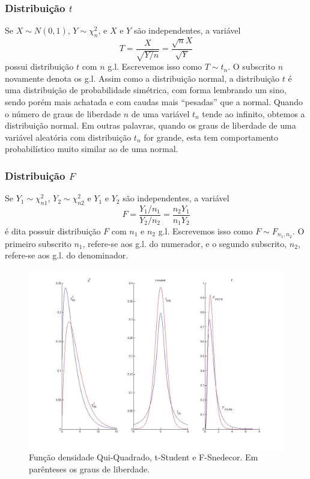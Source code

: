 \documentclass[
]{book}
\theoremstyle{definition}
\theoremstyle{definition}
\theoremstyle{definition}
\theoremstyle{remark}
\begin{document}
\hypertarget{distribuiuxe7uxe3o-t}{%
\subsubsection{\texorpdfstring{Distribuição \(t\)}{Distribuição t}}\label{distribuiuxe7uxe3o-t}}

Se \(X \sim N(0,1)\), \(Y \sim \chi^2_n\), e \(X\) e \(Y\) são independentes, a variável
\[T=\frac{X}{\sqrt{Y/n}}=\frac{\sqrt{n}X}{\sqrt{Y}}\]
possui distribuição \(t\) com \(n\) g.l. Escrevemos isso como \(T \sim t_n\). O subscrito \(n\) novamente
denota os g.l. Assim como a distribuição normal, a distribuição \(t\) é uma distribuição de probabilidade simétrica, com forma lembrando um sino, sendo porém mais achatada e com caudas mais ``pesadas'' que a normal. Quando o número de graus de liberdade \(n\) de uma variável \(t_n\) tende ao infinito, obtemos a distribuição normal. Em outras palavras, quando os graus de liberdade de uma variável aleatória com distribuição \(t_n\) for grande, esta tem comportamento probabilístico muito similar ao de uma normal.

\hypertarget{distribuiuxe7uxe3o-f}{%
\subsubsection{\texorpdfstring{Distribuição \(F\)}{Distribuição F}}\label{distribuiuxe7uxe3o-f}}

Se \(Y_1 \sim \chi^2_{n1}\), \(Y_2 \sim \chi^2_{n2}\) e \(Y_1\) e \(Y_2\) são independentes, a variável
\[F=\frac{Y_1/n_1}{Y_2/n_2}=\frac{n_2Y_1}{n_1Y_2}\]
é dita possuir distribuição \(F\) com \(n_1\) e \(n_2\) g.l. Escrevemos isso como \(F\sim F_{n_1,n_2}\). O primeiro subscrito \(n_1\), refere-se aos g.l. do numerador, e o segundo subscrito, \(n_2\), refere-se aos g.l. do denominador.

\begin{figure}

{\centering \includegraphics[width=0.8\linewidth]{Figuras/chi_t_F_density} 

}

\caption{Função densidade Qui-Quadrado, t-Student e F-Snedecor. Em parênteses os graus de liberdade.}\label{fig:len}
\end{figure}
\end{document}
